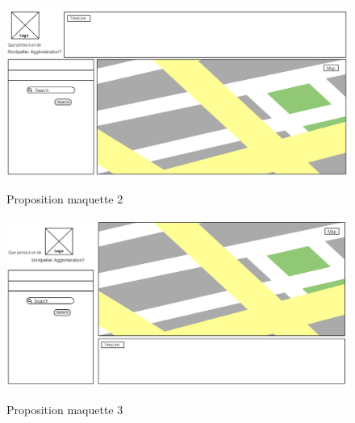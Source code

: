 \begin{center}
\begin{figure}[H] \centering
\includegraphics[width=17cm]{maquette_2.png}\\
\caption{\label{archi2} Proposition maquette 2}
\end{figure}
\end{center}

\begin{center}
\begin{figure}[H] \centering
\includegraphics[width=17cm]{maquette_3.png}\\
\caption{\label{archi2} Proposition maquette 3}
\end{figure}
\end{center}
